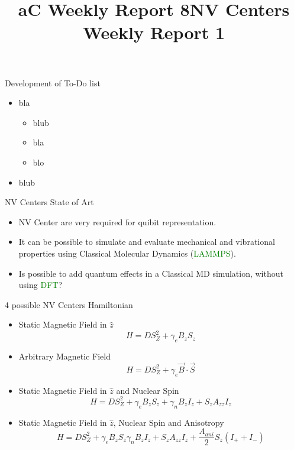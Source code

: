 \documentclass[11pt]{beamer}
\newcommand{\done}{\rlap{$\square$}{\raisebox{2pt}{\large\hspace{1pt}\ding{51}}}%
    \hspace{-2.5pt}}
\newcommand{\fail}{\rlap{$\square$}{\large\hspace{1pt}\ding{55}}}
\newcommand{\pend}{\rlap{$\square$}{\raisebox{2pt}{\large\hspace{1pt}}}%
    \hspace{6.5 pt}}
\begin{document}
\title[NV-aC8]{aC Weekly Report 8} 
\begin{frame}
\titlepage 
\end{frame}
\begin{frame}{Development of To-Do list}
\begin{itemize}
\item bla
\begin{itemize}
\item[\done] blub
\item[\fail] bla
\item[\pend] blo
\end{itemize}
\item blub
\end{itemize}
\end{frame} 
\title[NV-WR1]{NV Centers Weekly Report 1} 
\begin{frame}
\titlepage 
\end{frame}
\begin{frame}{NV Centers State of Art}
\begin{itemize}
    \item NV Center are very required for quibit representation.
    \item It can be possible to simulate and evaluate mechanical and vibrational properties using Classical Molecular Dynamics (\textcolor{green}{LAMMPS}).
    \item Is possible to add quantum effects in a Classical MD simulation, without using \textcolor{green}{DFT}?
\end{itemize}
\end{frame}
\begin{frame}{4 possible NV Centers Hamiltonian}
\begin{itemize}
    \item Static Magnetic Field in $\hat{z}$
    \begin{equation}H=DS_Z^2+\gamma_e B_zS_z\end{equation}
    \item Arbitrary Magnetic Field
    \begin{equation}H=DS_Z^2+\gamma_e \vec{B}\cdot\vec{S}\end{equation}
    \item Static Magnetic Field in $\hat{z}$ and Nuclear Spin
    \begin{equation}H=DS_Z^2+\gamma_e B_zS_z+\gamma_n B_zI_z+S_zA_{zz}I_{z}\end{equation}
    \item Static Magnetic Field in $\hat{z}$, Nuclear Spin and Anisotropy
    \begin{equation}H=DS_Z^2+\gamma_e B_zS_z\gamma_n B_zI_z+S_zA_{zz}I_{z}+\frac{A_{ani}}{2}S_z(I_++I_-)\end{equation}
\end{itemize}
\end{frame}
\end{document}
